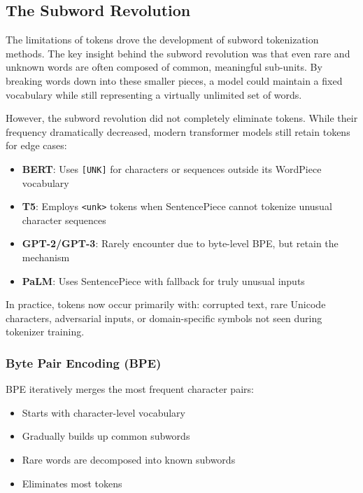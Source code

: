 \subsection{The Subword Revolution}

The limitations of \unk{} tokens drove the development of subword tokenization methods. The key insight behind the subword revolution was that even rare and unknown words are often composed of common, meaningful sub-units. By breaking words down into these smaller pieces, a model could maintain a fixed vocabulary while still representing a virtually unlimited set of words.

However, the subword revolution did not completely eliminate \unk{} tokens. While their frequency dramatically decreased, modern transformer models still retain \unk{} tokens for edge cases:

\begin{itemize}
\item \textbf{BERT}: Uses \texttt{[UNK]} for characters or sequences outside its WordPiece vocabulary
\item \textbf{T5}: Employs \texttt{<unk>} tokens when SentencePiece cannot tokenize unusual character sequences  
\item \textbf{GPT-2/GPT-3}: Rarely encounter \unk{} due to byte-level BPE, but retain the mechanism
\item \textbf{PaLM}: Uses SentencePiece with \unk{} fallback for truly unusual inputs
\end{itemize}

In practice, \unk{} tokens now occur primarily with: corrupted text, rare Unicode characters, adversarial inputs, or domain-specific symbols not seen during tokenizer training.

\subsubsection{Byte Pair Encoding (BPE)}
BPE \citep{sennrich2016neural} iteratively merges the most frequent character pairs:
\begin{itemize}
\item Starts with character-level vocabulary
\item Gradually builds up common subwords
\item Rare words are decomposed into known subwords
\item Eliminates most \unk{} tokens
\end{itemize}

